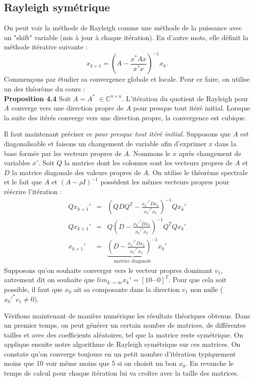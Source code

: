 \subsection*{Rayleigh symétrique}
On peut voir la méthode de Rayleigh comme une méthode de la puissance avec un "shift" variable (mis à jour à chaque itération). En d'autre mots, elle définit la méthode itérative suivante : 
$$x_{k+1} = \left(  A- \frac{x^*Ax}{x^*x}  \right)^{-1} x_k.  $$
Commençons par étudier sa convergence globale et locale. Pour ce faire, on utilise un des théorème du cours : \\
\textbf{Proposition 4.4} Soit $A = A^*$ $ \in \mathbb{C}^{n\times n}$. L'itération du quotient de Rayleigh pour $A$ converge vers une direction propre de $A$ pour presque tout itéré initial. Lorsque la suite des itérés converge vers une direction propre, la convergence est cubique. 

Il faut maintenant préciser ce \textit{pour presque tout itéré initial}. Supposons que $A$ est diagonalisable et faisons un changement de variable afin d'exprimer $x$ dans la base formée par les vecteurs propres de $A$. Nommons le $x$ après changement de variables $x'$. Soit $Q$ la matrice dont les colonnes sont les vecteurs propres de $A$ et $D$ la matrice diagonale des valeurs propres de $A$. On utilise le théorème spectrale et le fait que $A$ et $(A-\rho I)^{-1}$ possèdent les mêmes vecteurs propres pour réécrire l'itération : 
\begin{eqnarray}
Qx_{k+1}' & = &(Q D Q^T - \frac{x_k'^* D x_k}{x_k'^* x_k})^{-1} Qx_{k}'\\
Qx_{k+1}' & = & Q(D-\frac{x_k'^* D x_k}{x_k'^* x_k})^{-1}Q^T Qx_k'\\
x_{k+1}' & = & \underbrace{(D-\frac{x_k'^* D x_k}{x_k'^* x_k})^{-1}}_{\text{matrice diagonale}} x_k'
\end{eqnarray}
Supposons qu'on souhaite converger vers le vecteur propres dominant $v_1$, autrement dit on souhaite que $lim_{k\rightarrow \infty} x_k' = [1 0 \cdots 0]^T$. Pour que cela soit possible, il faut que $x_0$ ait sa composante dans la direction $v_1$ non nulle ($x_0'^* v_1 \neq 0$). 

Vérifions maintenant de manière numérique les résultats théoriques obtenus. Dans un premier temps, on peut générer un certain nombre de matrices, de différentes tailles et avec des coefficients aléatoires, tel que la matrice reste symétrique. On applique ensuite notre algorithme de Rayleigh symétrique sur ces matrices. On constate qu'on converge toujours en un petit nombre d'itération typiquement moins que 10 voir même moins que 5 si on choisit un bon $x_0$. En revanche le temps de calcul pour chaque itération lui va croître avec la taille des matrices.

